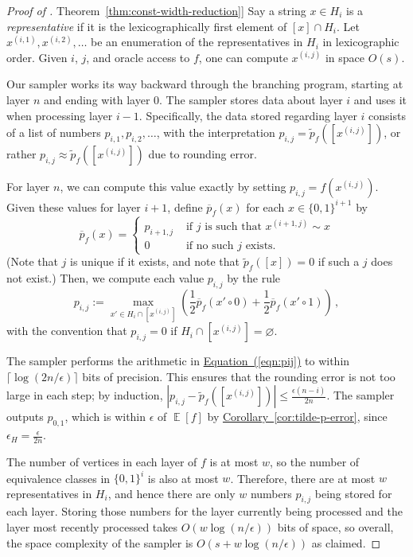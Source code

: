 \documentclass[10pt,a4paper]{article}
\DeclareMathOperator*{\ExpVal}{\mathbb E}
\newcommand{\expref}[2]{\hyperref[#2]{#1~\ref*{#2}}}
\newcommand{\expeqref}[2]{\hyperref[#2]{#1~(\ref*{#2})}}
\begin{document}
\begin{proof}[Proof of \expref{Theorem}{thm:const-width-reduction}]
Say a string $x \in H_i$ is a \emph{representative} if it is the lexicographically first element of $[x] \cap H_i$. Let $x^{(i, 1)}, x^{(i, 2)}, \dots$ be an enumeration of the representatives in $H_i$ in lexicographic order. Given $i$, $j$, and oracle access to $f$, one can compute $x^{(i, j)}$ in space $O(s)$.

Our sampler works its way backward through the branching program, starting at layer $n$ and ending with layer $0$. The sampler stores data about layer $i$ and uses it when processing layer $i - 1$. Specifically, the data stored regarding layer $i$ consists of a list of numbers $p_{i, 1}, p_{i, 2}, \dots$, with the interpretation $p_{i, j} = \widetilde{p}_f([x^{(i, j)}])$, or rather $p_{i, j} \approx \widetilde{p}_f([x^{(i, j)}])$ due to rounding error.

For layer $n$, we can compute this value exactly by setting $p_{i, j} = f(x^{(i, j)})$. 
Given these values for layer $i + 1$, define $\overline{p}_f(x)$ for each $x \in \{0, 1\}^{i + 1}$ by
\[
\overline{p}_f(x) = \begin{cases}
p_{i + 1, j} & \text{ if $j$ is such that $x^{(i + 1, j)} \sim x$} \\
0 & \text{ if no such $j$ exists.}
\end{cases}
\]
(Note that $j$ is unique if it exists, and note that $\widetilde{p}_f([x]) = 0$ if such a $j$ does not exist.) Then, we compute each value $p_{i, j}$ by the rule
\begin{equation} \label{eqn:pij}
p_{i, j} := \max_{x' \in H_i \cap [x^{(i, j)}]} \left(\frac{1}{2} \overline{p}_f(x' \circ 0) + \frac{1}{2} \overline{p}_f(x' \circ 1)\right)\,,
\end{equation}
with the convention that $p_{i, j} = 0$ if $H_i \cap [x^{(i, j)}] = \varnothing$.

The sampler performs the arithmetic in \expeqref{Equation}{eqn:pij} to within $\lceil \log(2n/\epsilon)\rceil$ bits of precision. This ensures that the rounding error is not too large in each step; by induction, $|p_{i, j} - \widetilde{p}_f([x^{(i, j)}])| \leq \frac{\epsilon (n - i)}{2n}$. The sampler outputs $p_{0, 1}$, which is within $\epsilon$ of $\ExpVal[f]$ by \expref{Corollary}{cor:tilde-p-error}, since $\epsilon_H = \frac{\epsilon}{2n}$.

The number of vertices in each layer of $f$ is at most $w$, so the number of equivalence classes in $\{0, 1\}^i$ is also at most $w$. Therefore, there are at most $w$ representatives in $H_i$, and hence there are only $w$ numbers $p_{i, j}$ being stored for each layer. Storing those numbers for the layer currently being processed and the layer most recently processed takes $O(w \log(n/\epsilon))$ bits of space, so overall, the space complexity of the sampler is $O(s + w \log(n/\epsilon))$ as claimed.
\end{proof}
\end{document}

